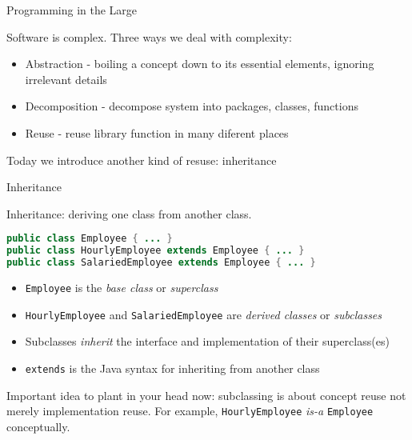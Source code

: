 \documentclass{beamer}
\author[Chris Simpkins] 
{Christopher Simpkins \\\texttt{chris.simpkins@gatech.edu}}
\institute[Georgia Tech] %
\date[CS 1331]{}
\title[\course] %
{\lesson}
\subtitle{}
\begin{document}
\begin{frame}
  \titlepage
\end{frame}

\begin{frame}[fragile]{Programming in the Large}


Software is complex.  Three ways we deal with complexity:
\begin{itemize}
\item Abstraction - boiling a concept down to its essential elements, ignoring irrelevant details
\item Decomposition - decompose system into packages, classes, functions
\item Reuse - reuse library function in many diferent places
\end{itemize}
\vspace{.1in}
Today we introduce another kind of resuse: inheritance

\end{frame}

\begin{frame}[fragile]{Inheritance}


Inheritance:  deriving one class from another class.
\begin{lstlisting}[language=Java]
public class Employee { ... }
public class HourlyEmployee extends Employee { ... }
public class SalariedEmployee extends Employee { ... }
\end{lstlisting}

\begin{itemize}
\item {\tt Employee} is the {\it base class} or {\it superclass}
\item {\tt HourlyEmployee} and {\tt SalariedEmployee} are {\it derived classes} or {\it subclasses}
\item Subclasses {\it inherit} the interface and implementation of their superclass(es)
\item {\tt extends} is the Java syntax for inheriting from another class
\end{itemize}

Important idea to plant in your head now: subclassing is about concept reuse not merely implementation reuse.  For example, {\tt HourlyEmployee} {\it is-a} {\tt Employee} conceptually.  

\end{frame}
\end{document}
